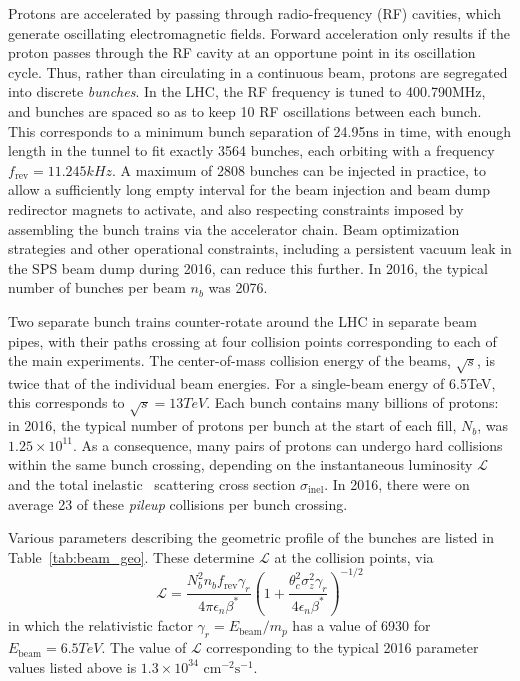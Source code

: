 \documentclass[oneside, letterpaper, 12pt, oldfontcommands]{memoir}
\begin{document}
Protons are accelerated by passing through radio-frequency (RF) cavities, which generate oscillating electromagnetic
fields. Forward acceleration only results if the proton passes through the RF cavity at an opportune point in its oscillation cycle.
Thus, rather than circulating in a continuous beam, protons are segregated into discrete \textit{bunches}. In the LHC, the RF
frequency is tuned to 400.790\unit{MHz}, and bunches are spaced so as to keep 10 RF oscillations between each bunch. This corresponds
to a minimum bunch separation of 24.95\unit{ns} in time, with enough length in the tunnel to fit exactly 3564 bunches, each orbiting
with a frequency $f_\mathrm{rev} = 11.245\unit{kHz}$. A maximum of
2808 bunches can be injected in practice, to allow a sufficiently long empty interval for the beam injection and beam dump
redirector magnets to activate, and also respecting constraints imposed by assembling the bunch trains via the accelerator chain.
Beam optimization strategies and other operational constraints, including a persistent vacuum leak in the SPS beam dump
during 2016, can reduce this further. In 2016, the typical number of bunches per beam $n_b$ was 2076.

Two separate bunch trains counter-rotate around the LHC in separate beam pipes, with their paths crossing at four collision points
corresponding to each of the main experiments. The center-of-mass collision energy of the beams, $\sqrt{s}$, is twice that of the
individual beam energies. For a single-beam energy of 6.5\unit{TeV}, this corresponds to $\sqrt{s} = 13\unit{TeV}$.
Each bunch contains many billions of protons: in 2016, the typical number of protons per bunch at the start of each fill, $N_b$, was $1.25 \times 10^{11}$.
As a consequence, many pairs of protons can undergo hard collisions within the same
bunch crossing, depending on the instantaneous luminosity $\mathcal{L}$ and the total inelastic \Pp\Pp\ scattering cross section $\sigma_\mathrm{inel}$.
In 2016, there were on average 23 of these \textit{pileup} collisions per bunch crossing.

Various parameters describing the geometric profile of the bunches
are listed in Table~\ref{tab:beam_geo}. These determine $\mathcal{L}$ at the collision points, via
\begin{equation}
\mathcal{L} = \frac{N_{b}^{2}n_{b}f_\mathrm{rev}\gamma_{r}}{4\pi\epsilon_{n}\beta^\mathrm{*}}\left(1 + \frac{\theta_{c}^{2}\sigma_{z}^{2}\gamma_{r}}{4\epsilon_{n}\beta^\mathrm{*}}\right)^{-1/2}
\label{eq:instantaneous_lumi}
\end{equation}
in which the relativistic factor $\gamma_{r} = E_\mathrm{beam}/m_{p}$ has a value of 6930 for $E_\mathrm{beam} = 6.5\unit{TeV}$.
The value of $\mathcal{L}$ corresponding to the typical 2016 parameter values listed above is $1.3 \times 10^{34}$ $\mathrm{cm}^{-2}\mathrm{s}^{-1}$.
\end{document}
